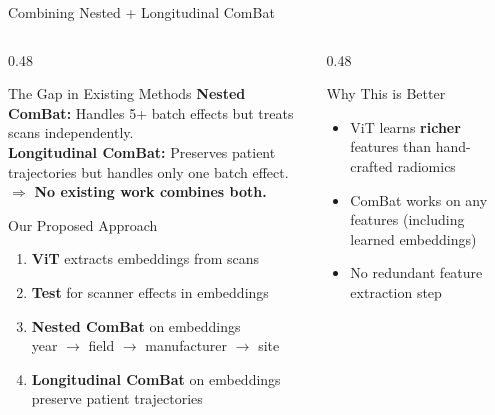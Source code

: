 \documentclass[aspectratio=169,xcolor=dvipsnames]{beamer}
\begin{document}
\begin{frame}{Combining Nested + Longitudinal ComBat}
    \begin{columns}
        \begin{column}{0.48\textwidth}
            \begin{alertblock}{The Gap in Existing Methods}
                \small
                \textbf{Nested ComBat:} Handles 5+ batch effects but treats scans independently.\\[0.3em]
                \textbf{Longitudinal ComBat:} Preserves patient trajectories but handles only one batch effect.\\[0.3em]
                $\Rightarrow$ \textbf{No existing work combines both.}
            \end{alertblock}

            \vspace{0.2em}

            \begin{exampleblock}{\small Our Proposed Approach}
                \small
                \begin{enumerate}
                    \item \textbf{ViT} extracts embeddings from scans
                    \item \textbf{Test} for scanner effects in embeddings
                    \item \textbf{Nested ComBat} on embeddings\\
                          {\scriptsize year $\to$ field $\to$ manufacturer $\to$ site}
                    \item \textbf{Longitudinal ComBat} on embeddings\\
                          {\scriptsize preserve patient trajectories}
                \end{enumerate}
            \end{exampleblock}
        \end{column}

        \begin{column}{0.48\textwidth}
            \begin{block}{Why This is Better}
                \small
                \begin{itemize}
                    \item ViT learns \textbf{richer} features than hand-crafted radiomics
                    \item ComBat works on any features (including learned embeddings)
                    \item No redundant feature extraction step
                \end{itemize}
            \end{block}


\end{column}
\end{columns}
\end{frame}
\end{document}
